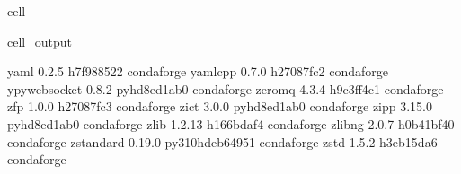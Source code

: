 \documentclass[letterpaper,table,10pt,english]{jupyterBook}
\begin{document}
\begin{sphinxuseclass}{cell}
\begin{sphinxVerbatimOutput}
\begin{sphinxuseclass}{cell_output}
\begin{sphinxVerbatim}[commandchars=\\\{\}]
yaml                      0.2.5                h7f98852\PYGZus{}2    conda\PYGZhy{}forge
yaml\PYGZhy{}cpp                  0.7.0                h27087fc\PYGZus{}2    conda\PYGZhy{}forge
ypy\PYGZhy{}websocket             0.8.2              pyhd8ed1ab\PYGZus{}0    conda\PYGZhy{}forge
zeromq                    4.3.4                h9c3ff4c\PYGZus{}1    conda\PYGZhy{}forge
zfp                       1.0.0                h27087fc\PYGZus{}3    conda\PYGZhy{}forge
zict                      3.0.0              pyhd8ed1ab\PYGZus{}0    conda\PYGZhy{}forge
zipp                      3.15.0             pyhd8ed1ab\PYGZus{}0    conda\PYGZhy{}forge
zlib                      1.2.13               h166bdaf\PYGZus{}4    conda\PYGZhy{}forge
zlib\PYGZhy{}ng                   2.0.7                h0b41bf4\PYGZus{}0    conda\PYGZhy{}forge
zstandard                 0.19.0          py310hdeb6495\PYGZus{}1    conda\PYGZhy{}forge
zstd                      1.5.2                h3eb15da\PYGZus{}6    conda\PYGZhy{}forge
\end{sphinxVerbatim}

\end{sphinxuseclass}\end{sphinxVerbatimOutput}

\end{sphinxuseclass}
\end{document}
